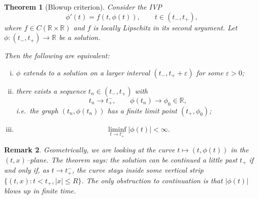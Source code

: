 \documentclass{tufte-handout}
\newcommand*\R{\mathbb{R}}
\newtheorem{thm}{Theorem}[subsection]
\newtheorem{rmk}[thm]{Remark}
\theoremstyle{definition}
\begin{document}
\begin{thm}[Blowup criterion]\label{thm:blowup}
	Consider the IVP
	\[
		\phi'(t) = f(t,\phi(t)), \qquad t \in (t_-,t_+),
	\]
	where $f \in C(\R \times \R)$ and $f$ is locally Lipschitz in its second argument.
	Let $\phi \colon (t_-,t_+) \to \R$ be a solution.

	Then the following are equivalent:
	\begin{enumerate}[(i)]
		\item $\phi$ extends to a solution on a larger interval
		      $(t_-,t_+ + \varepsilon)$ for some $\varepsilon > 0$;
		\item there exists a sequence $t_n \in (t_-,t_+)$ with
		      \[
		      	t_n \to t_+^{-}, \qquad \phi(t_n) \to \phi_0 \in \R,
		      \]
		      i.e.\ the graph $(t_n,\phi(t_n))$ has a finite limit point $(t_+,\phi_0)$;
		\item 
		      \[
		      	\liminf_{t \to t_+^{-}} |\phi(t)| < \infty.
		      \]
	\end{enumerate}
\end{thm}

\begin{rmk}
	Geometrically, we are looking at the curve $t \mapsto (t,\phi(t))$ in the $(t,x)$–plane.
	The theorem says:
	the solution can be continued a little past $t_+$ if and only if, as
	$t \to t_+^{-}$, the curve stays inside some vertical strip
	$\{(t,x) : t < t_+, |x| \le R\}$.
	The only obstruction to continuation is that $|\phi(t)|$ blows up in finite time.
\end{rmk}
\end{document}
